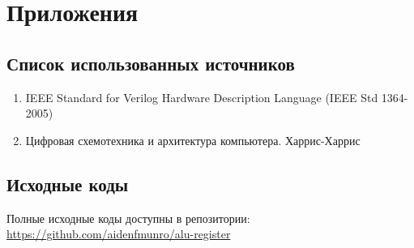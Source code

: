 \documentclass[a4paper,12pt]{article}
\begin{document}
\section{Приложения}
\subsection{Список использованных источников}
\begin{enumerate}
    \item IEEE Standard for Verilog Hardware Description Language (IEEE Std 1364-2005)
    \item Цифровая схемотехника и архитектура компьютера. Харрис-Харрис
\end{enumerate}

\subsection{Исходные коды}
Полные исходные коды доступны в репозитории: \\
\url{https://github.com/aidenfmunro/alu-register}
\end{document}
